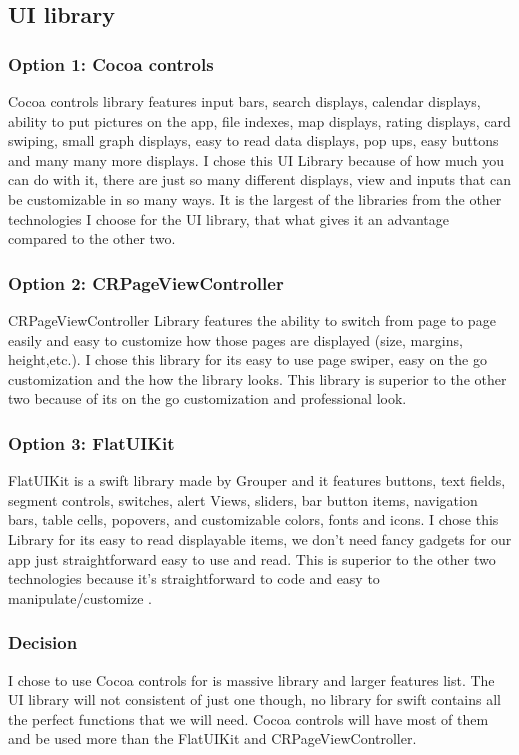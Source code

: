 \documentclass[onecolumn, draftclsnofoot,10pt, compsoc]{IEEEtran}
\begin{document}
\subsection{UI library}
\subsubsection{Option 1: Cocoa controls}
Cocoa controls library features input bars, search displays, calendar displays, ability to put pictures on the app, file indexes, map displays, rating displays, card swiping, small graph displays, easy to read data displays, pop ups, easy buttons and many many more displays.
I chose this UI Library because of how much you can do with it, there are just so many different displays, view and inputs that can be customizable in so many ways.
It is the largest of the libraries from the other technologies I choose for the UI library, that what gives it an advantage compared to the other two.
\subsubsection{Option 2: CRPageViewController}
CRPageViewController Library features the ability to switch from page to page easily and easy to customize how those pages are displayed (size, margins, height,etc.).
 I chose this library for its easy to use page swiper, easy on the go customization and the how the library looks.
This library is superior to the other two because of its on the go customization and professional look.
\subsubsection{Option 3: FlatUIKit}
FlatUIKit is a swift library made by Grouper and it features buttons, text fields, segment controls, switches, alert Views, sliders, bar button items, navigation bars, table cells, popovers, and customizable colors, fonts and icons.
 I chose this Library for its easy to read displayable items, we don't need fancy gadgets for our app just straightforward easy to use and read.
 This is superior to the other two technologies because it's straightforward to code and easy to manipulate/customize .
\subsubsection{Decision}
I chose to use Cocoa controls for is massive library and larger features list.
The UI library will not consistent of just one though, no library for swift contains all the perfect functions that we will need.
Cocoa controls will have most of them and be used more than the FlatUIKit and CRPageViewController.
\end{document}
